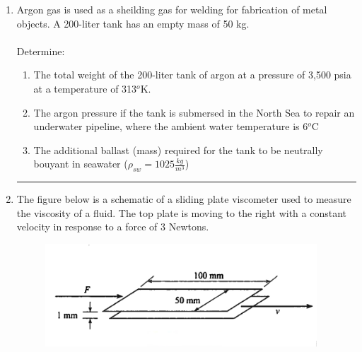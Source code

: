 \documentclass[12pt]{article}
\begin{document}
\begin{enumerate}
\item Argon gas is used as a sheilding gas for welding for fabrication of metal objects. A 200-liter tank has an empty mass of 50 kg. \\ \\
Determine:
\begin{enumerate}
\item The total weight of the 200-liter tank of argon at a pressure of 3,500 psia at a temperature of 313$^o$K.  
\item The argon pressure if the tank is submersed in the North Sea to repair an underwater pipeline, where the ambient water temperature is 6$^o$C
\item The additional ballast (mass) required for the tank to be neutrally bouyant in seawater ($\rho_{sw}= 1025 \frac{kg}{m^3}$)
\end{enumerate}
\noindent\rule{\linewidth}{0.4pt}
\clearpage
\item The figure below is a schematic of a sliding plate viscometer used to measure the viscosity of a fluid. The top plate is moving to the right with a constant velocity in response to a force of 3 Newtons.
 

\begin{figure}[htbp] %
   \centering
   \includegraphics[width=4in]{SlidingPlateViscosity.png} 
   \caption{}
   \label{fig:slidingplateviscosity}
\end{figure}


\end{enumerate}
\end{document}
